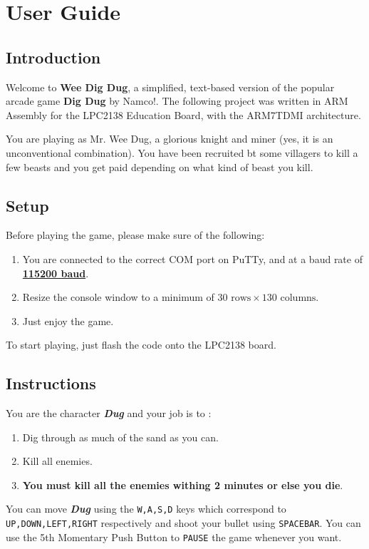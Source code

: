 \section{User Guide}

  \subsection{Introduction}
  
  Welcome to \textbf{Wee Dig Dug}, a simplified, text-based version of the popular arcade game \textbf{Dig Dug} by Namco!.
  The following project was written in ARM Assembly for the LPC2138 Education Board, with the ARM7TDMI architecture.

  You are playing as Mr. Wee Dug, a glorious knight and miner (yes, it is an unconventional combination).
  You have been recruited bt some villagers to kill a few beasts and you get paid depending on what kind of beast you kill.

  \subsection{Setup}

  Before playing the game, please make sure of the following:

  \begin{enumerate} 
    \item You are connected to the correct COM port on PuTTy, and at a baud rate of \textbf{\underline{115200 baud}}.
    \item Resize the console window to a minimum of $ 30 \text{ rows} \times 130 \text{ columns} $.
    \item Just enjoy the game.
  \end{enumerate}

  To start playing, just flash the code onto the LPC2138 board.

  \subsection{Instructions}

  You are the character \textbf{\textit{Dug}} and your job is to :

  \begin{enumerate}
    \item Dig through as much of the sand as you can.
    \item Kill all enemies.
    \item \textbf{You must kill all the enemies withing 2 minutes or else you die}.
  \end{enumerate}

  You can move \textbf{\textit{Dug}} using the \texttt{W,A,S,D} keys which correspond to 
  \texttt{UP,DOWN,LEFT,RIGHT} respectively and shoot your bullet using \texttt{SPACEBAR}.
  You can use the 5th Momentary Push Button to \texttt{PAUSE} the game whenever you want.


